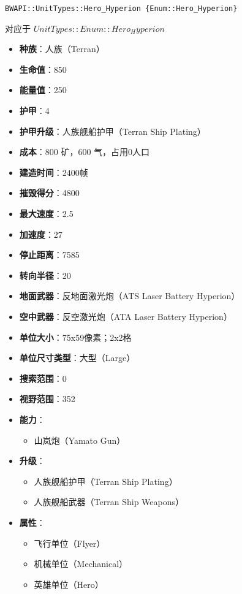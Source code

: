 \begin{tcolorbox}[colback=white, colframe=black!60!white, title=Hero\_Hyperion(), arc=0mm]
    \begin{verbatim}
BWAPI::UnitTypes::Hero_Hyperion {Enum::Hero_Hyperion}
    \end{verbatim}
    对应于  $ UnitTypes::Enum::Hero_Hyperion $ 
    \begin{itemize}
        \item \textbf{种族}：人族（Terran）
        \item \textbf{生命值}：850
        \item \textbf{能量值}：250
        \item \textbf{护甲}：4
        \item \textbf{护甲升级}：人族舰船护甲（Terran Ship Plating）
        \item \textbf{成本}：800 矿，600 气，占用0人口
        \item \textbf{建造时间}：2400帧
        \item \textbf{摧毁得分}：4800
        \item \textbf{最大速度}：2.5
        \item \textbf{加速度}：27
        \item \textbf{停止距离}：7585
        \item \textbf{转向半径}：20
        \item \textbf{地面武器}：反地面激光炮（ATS Laser Battery Hyperion）
        \item \textbf{空中武器}：反空激光炮（ATA Laser Battery Hyperion）
        \item \textbf{单位大小}：75x59像素；2x2格
        \item \textbf{单位尺寸类型}：大型（Large）
        \item \textbf{搜索范围}：0
        \item \textbf{视野范围}：352
        \item \textbf{能力}：
            \begin{itemize}
                \item 山岚炮（Yamato Gun）
            \end{itemize}
        \item \textbf{升级}：
            \begin{itemize}
                \item 人族舰船护甲（Terran Ship Plating）
                \item 人族舰船武器（Terran Ship Weapons）
            \end{itemize}
        \item \textbf{属性}：
            \begin{itemize}
                \item 飞行单位（Flyer）
                \item 机械单位（Mechanical）
                \item 英雄单位（Hero）
            \end{itemize}
    \end{itemize}
    
\end{tcolorbox}

